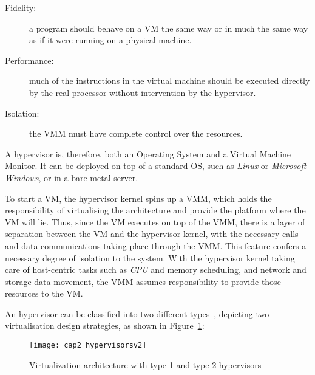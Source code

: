 \begin{description}
	\item[Fidelity:] a program should behave on a VM the same way or in much the same way as if it were running on a physical machine.
	\item[Performance:] much of the instructions in the virtual machine should be executed directly by the real processor without intervention by the hypervisor.
	\item[Isolation:] the VMM must have complete control over the resources. 
\end{description}

A hypervisor is, therefore, both an Operating System and a Virtual Machine Monitor. It can be deployed on top of a standard OS, such as \textit{Linux} or \textit{Microsoft Windows}, or in a bare metal server.

To start a VM, the hypervisor kernel spins up a VMM, which holds the responsibility of virtualising the architecture and provide the platform where the VM will lie. Thus, since the VM executes on top of the VMM, there is a layer of separation between the VM and the hypervisor kernel, with the necessary calls and data communications taking place through the VMM. This feature confers a necessary degree of isolation to the system. With the hypervisor  kernel taking care of host-centric tasks such as \textit{CPU} and memory scheduling, and network and storage data movement, the VMM assumes responsibility to provide those resources to the VM.

An hypervisor can be classified into two different types~\cite{Aneja2011}, depicting two virtualisation design strategies, as shown in Figure~\ref{fig:hypervisors}:

\begin{figure}[htbp]
	\centering
	\texttt{[image: cap2\_hypervisorsv2]}
	\caption{Virtualization architecture with type 1 and type 2 hypervisors}
	\label{fig:hypervisors}
\end{figure}

